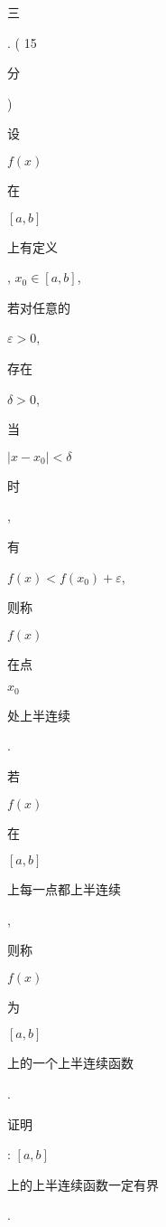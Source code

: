 \documentclass[10pt]{article}
\begin{document}
\begin{CJK}{UTF8}{mj}三\end{CJK}. ( 15 \begin{CJK}{UTF8}{mj}分\end{CJK}) \begin{CJK}{UTF8}{mj}设\end{CJK} $f(x)$ \begin{CJK}{UTF8}{mj}在\end{CJK} $[a, b]$ \begin{CJK}{UTF8}{mj}上有定义\end{CJK}, $x_{0} \in[a, b]$, \begin{CJK}{UTF8}{mj}若对任意的\end{CJK} $\varepsilon>0$, \begin{CJK}{UTF8}{mj}存在\end{CJK} $\delta>0$, \begin{CJK}{UTF8}{mj}当\end{CJK} $\left|x-x_{0}\right|<\delta$ \begin{CJK}{UTF8}{mj}时\end{CJK}, \begin{CJK}{UTF8}{mj}有\end{CJK} $f(x)<f\left(x_{0}\right)+\varepsilon$, \begin{CJK}{UTF8}{mj}则称\end{CJK} $f(x)$ \begin{CJK}{UTF8}{mj}在点\end{CJK} $x_{0}$ \begin{CJK}{UTF8}{mj}处上半连续\end{CJK}. \begin{CJK}{UTF8}{mj}若\end{CJK} $f(x)$ \begin{CJK}{UTF8}{mj}在\end{CJK} $[a, b]$ \begin{CJK}{UTF8}{mj}上每一点都上半连续\end{CJK}, \begin{CJK}{UTF8}{mj}则称\end{CJK} $f(x)$ \begin{CJK}{UTF8}{mj}为\end{CJK} $[a, b]$ \begin{CJK}{UTF8}{mj}上的一个上半连续函数\end{CJK}. \begin{CJK}{UTF8}{mj}证明\end{CJK}: $[a, b]$ \begin{CJK}{UTF8}{mj}上的上半连续函数一定有界\end{CJK}.
\end{document}
